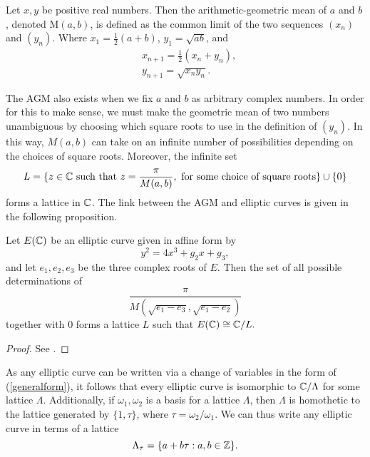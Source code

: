 \begin{definition}
Let $x,y$ be positive real numbers. Then the arithmetic-geometric mean of $a$ and $b$, denoted $\text{M}(a,b)$, is defined as the common limit of the two sequences $(x_n)$ and $(y_n)$. Where $x_1 = \frac{1}{2}(a+b)$, $y_1 = \sqrt{ab}$, and
\begin{align*}
&x_{n+1} = \frac{1}{2}(x_n +y_n), \\
&y_{n+1} = \sqrt{x_ny_n}.
\end{align*}
\end{definition}
The AGM also exists when we fix $a$ and $b$ as arbitrary complex numbers. In order for this to make sense, we must make the geometric mean of two numbers unambiguous by choosing which square roots to use in the definition of $(y_n)$. In this way, $M(a,b)$ can take on an infinite number of possibilities depending on the choices of square roots. Moreover, the infinite set
\begin{equation}
L = \{z \in \mathbb{C} \text{ such that } z = \frac{\pi}{M(a,b)}, \text{ for some choice of square roots}\} \cup \{0\}
\end{equation}
forms a lattice in $\mathbb{C}$. The link between the AGM and elliptic curves is given in the following proposition.

\begin{thm}
Let $E(\mathbb{C})$ be an elliptic curve given in affine form by 
\begin{equation}\label{generalform}
y^2 = 4x^3 + g_2x + g_3,
\end{equation}
and let $e_1,e_2,e_3$ be the three complex roots of $E$. Then the set of all possible determinations of 
$$\frac{\pi}{M(\sqrt{e_1 - e_3}, \sqrt{e_1 - e_2})}$$
together with 0 forms a lattice $L$ such that $E(\mathbb{C}) \cong \mathbb{C}/L.$
\end{thm}
\begin{proof}
See \cite[ Section VI.9]{Knapp}.
\end{proof}
As any elliptic curve can be written via a change of variables in the form of (\ref{generalform}), it follows that every elliptic curve is isomorphic to $\mathbb{C}/\Lambda$ for some lattice $\Lambda$. Additionally, if $\omega_1,\omega_2$ is a basis for a lattice $\Lambda$, then $\Lambda$ is homothetic to the lattice generated by $\{1,\tau\}$, where $\tau = \omega_2/\omega_1$. We can thus write any elliptic curve in terms of a lattice
$$\Lambda_\tau = \{a + b\tau : a,b \in \mathbb{Z}\}.$$


